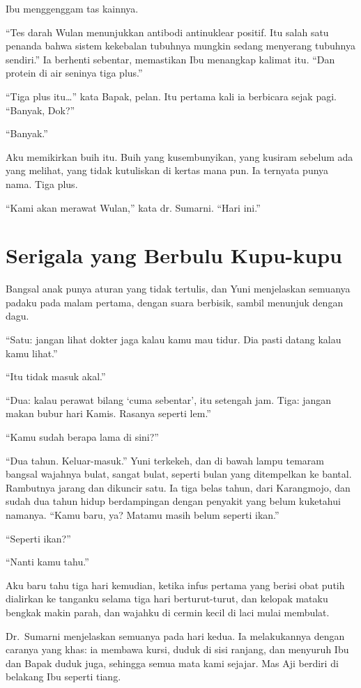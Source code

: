 \documentclass[11pt,twoside,openany]{book}
\makeatletter
\newcommand{\scenebreak}{\par\vspace{0.9em}{\centering\textsc{*\hspace{0.7em}*\hspace{0.7em}*}\par}\vspace{0.9em}\@afterindentfalse\@afterheading}
\makeatother
\begin{document}
Ibu menggenggam tas kainnya.

``Tes darah Wulan menunjukkan antibodi antinuklear positif. Itu salah satu penanda bahwa sistem kekebalan tubuhnya mungkin sedang menyerang tubuhnya sendiri.'' Ia berhenti sebentar, memastikan Ibu menangkap kalimat itu. ``Dan protein di air seninya tiga plus.''

``Tiga plus itu\ldots{}'' kata Bapak, pelan. Itu pertama kali ia berbicara sejak pagi. ``Banyak, Dok?''

``Banyak.''

Aku memikirkan buih itu. Buih yang kusembunyikan, yang kusiram sebelum ada yang melihat, yang tidak kutuliskan di kertas mana pun. Ia ternyata punya nama. Tiga plus.

``Kami akan merawat Wulan,'' kata dr. Sumarni. ``Hari ini.''

\chapter{Serigala yang Berbulu Kupu-kupu}
Bangsal anak punya aturan yang tidak tertulis, dan Yuni menjelaskan semuanya padaku pada malam pertama, dengan suara berbisik, sambil menunjuk dengan dagu.

``Satu: jangan lihat dokter jaga kalau kamu mau tidur. Dia pasti datang kalau kamu lihat.''

``Itu tidak masuk akal.''

``Dua: kalau perawat bilang `cuma sebentar', itu setengah jam. Tiga: jangan makan bubur hari Kamis. Rasanya seperti lem.''

``Kamu sudah berapa lama di sini?''

``Dua tahun. Keluar-masuk.'' Yuni terkekeh, dan di bawah lampu temaram bangsal wajahnya bulat, sangat bulat, seperti bulan yang ditempelkan ke bantal. Rambutnya jarang dan dikuncir satu. Ia tiga belas tahun, dari Karangmojo, dan sudah dua tahun hidup berdampingan dengan penyakit yang belum kuketahui namanya. ``Kamu baru, ya? Matamu masih belum seperti ikan.''

``Seperti ikan?''

``Nanti kamu tahu.''

Aku baru tahu tiga hari kemudian, ketika infus pertama yang berisi obat putih dialirkan ke tanganku selama tiga hari berturut-turut, dan kelopak mataku bengkak makin parah, dan wajahku di cermin kecil di laci mulai membulat.

\scenebreak
Dr.~Sumarni menjelaskan semuanya pada hari kedua. Ia melakukannya dengan caranya yang khas: ia membawa kursi, duduk di sisi ranjang, dan menyuruh Ibu dan Bapak duduk juga, sehingga semua mata kami sejajar. Mas Aji berdiri di belakang Ibu seperti tiang.
\end{document}
